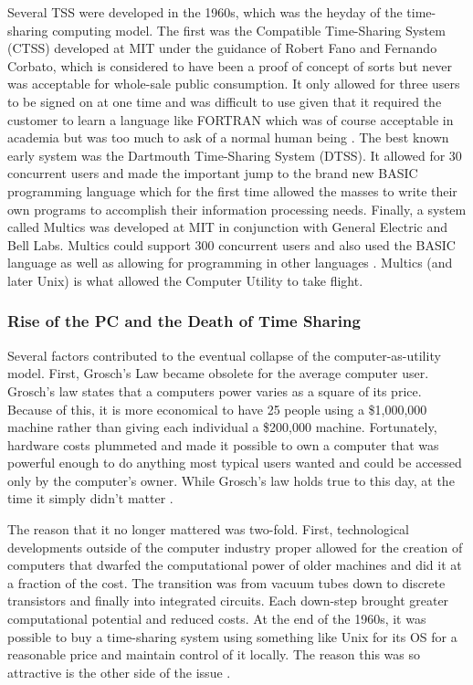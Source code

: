 \documentclass[12pt,oneside,letterpaper]{article}
\begin{document}
Several TSS were developed in the 1960s, which was the heyday of the
time-sharing computing model.  The first was the Compatible Time-Sharing System
(CTSS) developed at MIT under the guidance of Robert Fano and Fernando Corbato,
which is considered to have been a proof of concept of sorts but never was
acceptable for whole-sale public consumption.  It only allowed for three users
to be signed on at one time and was difficult to use given that it required the
customer to learn a language like FORTRAN which was of course acceptable in
academia but was too much to ask of a normal human being \citep{kelly2004}.
The best known early system was the Dartmouth Time-Sharing System (DTSS).  It
allowed for 30 concurrent users and made the important jump to the brand new
BASIC programming language which for the first time allowed the masses to write
their own programs to accomplish their information processing needs.  Finally, a
system called Multics was developed at MIT in conjunction with General Electric
and Bell Labs.  Multics could support 300 concurrent users and also used the
BASIC language as well as allowing for programming in other languages
\citep{levy1994}.  Multics (and later Unix) is what allowed the Computer Utility
to take flight.

\subsubsection{Rise of the PC and the Death of Time Sharing}

Several factors contributed to the eventual collapse of the computer-as-utility
model.  First, Grosch's Law became obsolete for the average computer user.
Grosch's law states that a computers power varies as a square of its price.
Because of this, it is more economical to have 25 people using a \$1,000,000
machine rather than giving each individual a \$200,000 machine.  Fortunately,
hardware costs plummeted and made it possible to own a computer that was
powerful enough to do anything most typical users wanted and could be accessed
only by the computer's owner.  While Grosch's law holds true to this day, at the
time it simply didn't matter \citep{kelly2004}.

The reason that it no longer mattered was two-fold.  First, technological
developments outside of the computer industry proper allowed for the creation of
computers that dwarfed the computational power of older machines and did it at a
fraction of the cost.  The transition was from vacuum tubes down to discrete
transistors and finally into integrated circuits.  Each down-step brought
greater computational potential and reduced costs.  At the end of the 1960s, it
was possible to buy a time-sharing system using something like Unix for its OS
for a reasonable price and maintain control of it locally.  The reason this was
so attractive is the other side of the issue \citep{kelly2004}.
\end{document}
